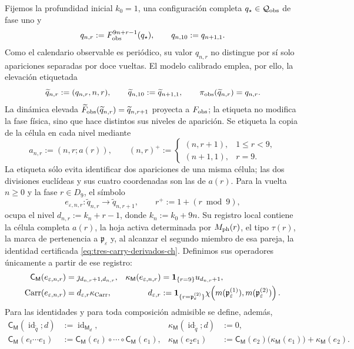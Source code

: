 Fijemos la profundidad inicial \(k_0=1\), una configuración completa
\(q_\star\in\mathcal Q_{\rm obs}\) de fase uno y
\[
 q_{n,r}:=F_{\rm obs}^{9n+r-1}(q_\star),\qquad
 q_{n,10}:=q_{n+1,1}.
\]
Como el calendario observable es periódico, su valor \(q_{n,r}\) no
distingue por sí solo apariciones separadas por doce vueltas. El modelo
calibrado emplea, por ello, la elevación etiquetada
\[
 \widetilde q_{n,r}:=(q_{n,r},n,r),\qquad
 \widetilde q_{n,10}:=\widetilde q_{n+1,1},\qquad
 \pi_{\rm obs}(\widetilde q_{n,r})=q_{n,r}.
\]
La dinámica elevada
\(\widetilde F_{\rm obs}(\widetilde q_{n,r})
=\widetilde q_{n,r+1}\) proyecta a \(F_{\rm obs}\); la etiqueta no modifica
la fase física, sino que hace distintos sus niveles de aparición.
Se etiqueta la copia de la célula en cada nivel mediante
\[
 a_{n,r}:=(n,r;a(r)),\qquad
 (n,r)^+:=
 \begin{cases}
  (n,r+1),&1\le r<9,\\
  (n+1,1),&r=9.
 \end{cases}
\]
La etiqueta sólo evita identificar dos apariciones de una misma célula; las
dos divisiones euclídeas y sus cuatro coordenadas son las de \(a(r)\).
Para la vuelta \(n\ge0\) y la fase \(r\in D_9\), el símbolo
\[
 e_{\varepsilon,n,r}:\widetilde q_{n,r}
 \longrightarrow\widetilde q_{n,r+1},
 \qquad r^+:=1+(r\bmod9),
\]
ocupa el nivel
\(d_{n,r}:=k_n+r-1\), donde \(k_n:=k_0+9n\). Su registro local contiene
la célula completa \(a(r)\), la hoja activa determinada por \(M_{\rm ph}(r)\),
el tipo \(\tau(r)\),
la marca de pertenencia a \(\mathfrak p_\varepsilon\) y, al alcanzar el segundo miembro
de esa pareja, la identidad certificada
\eqref{eq:tres-carry-derivados-ch}. Definimos sus operadores únicamente a
partir de ese registro:
\begin{align}
 \mathsf C_{\mathsf M}(e_{\varepsilon,n,r})
   &=\jmath_{d_{n,r}+1,d_{n,r}},&
 \kappa_{\mathsf M}(e_{\varepsilon,n,r})
   &=\mathbf1_{\{r=9\}}u_{d_{n,r}+1},
 \label{eq:memoria-arista-ch}\\
       \operatorname{Carr}(e_{\varepsilon,n,r})
   &=d_{\varepsilon,r}\kappa_{\rm Carr},&
 d_{\varepsilon,r}
   &:=\mathbf1_{\{r=\mathfrak p_\varepsilon^{(2)}\}}
       \chi\!\left(m(\mathfrak p_\varepsilon^{(1)}),
                    m(\mathfrak p_\varepsilon^{(2)})\right).
 \label{eq:carry-arista-derivado-ch}
\end{align}
Para las identidades y para toda composición admisible se define, además,
\begin{align}
 \mathsf C_{\mathsf M}(\operatorname{id}_{\widetilde q};d)
   &:=\operatorname{id}_{\mathsf M_d},&
 \kappa_{\mathsf M}(\operatorname{id}_{\widetilde q};d)&:=0,
 \label{eq:memoria-identidad-ch}\\
 \mathsf C_{\mathsf M}(e_t\cdots e_1)
   &:=\mathsf C_{\mathsf M}(e_t)\circ\cdots\circ
      \mathsf C_{\mathsf M}(e_1),&
 \kappa_{\mathsf M}(e_2e_1)
   &:=\mathsf C_{\mathsf M}(e_2)
        \bigl(\kappa_{\mathsf M}(e_1)\bigr)
      +\kappa_{\mathsf M}(e_2).
 \label{eq:cociclo-memoria-calibrado-ch}
\end{align}
